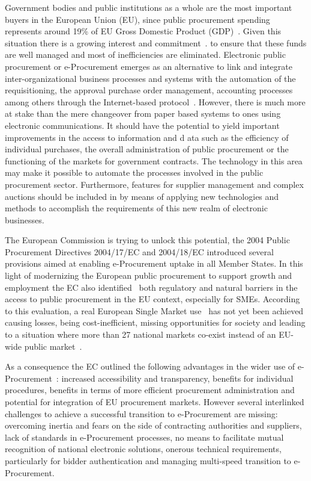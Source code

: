 \documentclass[preprint,12pt]{elsarticle}
\begin{document}
Government bodies and public institutions as a whole are the most important buyers in the European Union (EU), since public procurement spending represents around 19\% of 
EU Gross Domestic Product (GDP)~\cite{d2010}. Given this situation there is a growing interest and commitment~\cite{d2010a}. to ensure that these funds are 
well managed and most of inefficiencies are eliminated. Electronic public procurement or e-Procurement emerges as an alternative to link and 
integrate inter-organizational business processes and systems with the automation of the requisitioning, the approval purchase order 
management, accounting processes among others through the Internet-based protocol~\cite{Podlogar2007}.  However, there is much more at stake than the mere changeover 
from paper based systems to ones using electronic communications. It should have the potential to yield important improvements in the access to information and d
ata such as the efficiency of individual purchases, the overall administration of public procurement or the functioning of the markets for government contracts. 
The technology in this area may make it possible to automate the processes involved in the public procurement sector. Furthermore, features for supplier 
management and complex auctions should be included in by means of applying new technologies and methods to accomplish the requirements of this new realm of electronic businesses.


The European Commission is trying to unlock this potential, the 2004 Public Procurement Directives 2004/17/EC and 2004/18/EC 
introduced several provisions aimed at enabling e-Procurement uptake in all Member States. In this light of 
modernizing the European public procurement to support growth and employment the EC also identified~\cite{siemensEval} both regulatory and natural barriers in the access to 
public procurement in the EU context, especially for SMEs. According to this evaluation, a real European Single Market use~\cite{d2011} 
has not yet been achieved causing losses, being cost-inefficient, missing opportunities for society and leading to a 
situation where more than 27 national markets co-exist instead of an EU-wide public market~\cite{monti2010}.

As a consequence the EC outlined the following advantages in the wider use of e-Procurement~\cite{d2010}: increased accessibility and transparency, benefits for individual procedures, 
benefits in terms of more efficient procurement administration and potential for integration of EU procurement markets. 
However several interlinked challenges to achieve a successful transition to e-Procurement are missing: overcoming inertia 
and fears on the side of contracting authorities and suppliers, lack of standards in e-Procurement processes, no means 
to facilitate mutual recognition of national electronic solutions, onerous technical requirements, 
particularly for bidder authentication and managing multi-speed transition to e-Procurement. 
\end{document}
